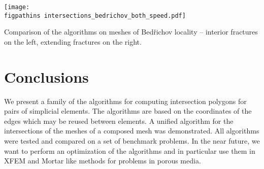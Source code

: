 \begin{graph}[!htb]
    \centering
    \texttt{[image: \\figpathins intersections\_bedrichov\_both\_speed.pdf]}
    \caption[Comparison of the algorithms on meshes of Bed{\v r}ichov locality.]
    {Comparison of the algorithms on meshes of Bed{\v r}ichov locality -- interior fractures on the left,
             extending fractures on the right.}
    \label{graph:bedrichov_speed}
\end{graph}





\section{Conclusions}
\label{sec:conclusins}
We present a family of the algorithms for computing intersection polygons for pairs of simplicial elements.
The algorithms are based on the \plucker coordinates of the edges which may be reused between elements.
A unified algorithm for the intersections of the meshes of a composed mesh was demonstrated. All algorithms were 
tested and compared on a set of benchmark problems. In the near future, we want to perform an optimization of 
the algorithms and in particular use them in XFEM and Mortar 
like methods for problems in porous media.

% 


